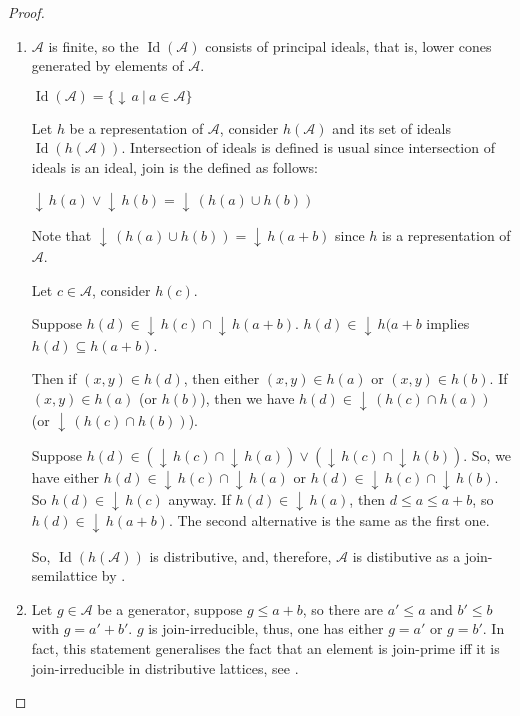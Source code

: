\documentclass[a4paper]{article}
\theoremstyle{definition}
\theoremstyle{theorem}
\theoremstyle{proposition}
\theoremstyle{lemma}
\theoremstyle{ex}
\theoremstyle{corollary}
\theoremstyle{claim}
\newcommand{\down}[1]{\ensuremath{{\downarrow}\,#1}}
\begin{document}
\begin{proof}
$ $

  \begin{enumerate}
    \item
    $\mathcal{A}$ is finite, so the $\operatorname{Id}(\mathcal{A})$ consists of principal ideals, that is, lower cones generated by elements of $\mathcal{A}$.

    \begin{center}
    $\operatorname{Id}(\mathcal{A}) = \{ \down{a} \: | \: a \in \mathcal{A} \}$
    \end{center}

    Let $h$ be a representation of $\mathcal{A}$, consider $h(\mathcal{A})$ and its set of ideals $\operatorname{Id}(h(\mathcal{A}))$. Intersection of ideals is defined is usual since intersection of ideals is an ideal, join is the defined as follows:

    \begin{center}
    $\down{h(a)} \vee \down{h(b)} = \down{(h(a) \cup h(b))}$
    \end{center}
    Note that $\down{(h(a) \cup h(b))} = \down{h(a + b)}$ since $h$ is a representation of $\mathcal{A}$.

    Let $c \in \mathcal{A}$, consider $h(c)$.

    Suppose $h(d) \in \down{h(c)} \cap \down{h(a + b)}$.
    $h(d) \in \down{h(a + b}$ implies $h(d) \subseteq h(a + b)$.

    Then if $(x, y) \in h(d)$, then either $(x, y) \in h(a)$ or $(x, y) \in h(b)$.
    If $(x, y) \in h(a)$ (or $h(b)$), then we have $h(d) \in \down{(h(c) \cap h(a))}$ (or $\down{(h(c) \cap h(b))}$).

    Suppose $h(d) \in (\down{h(c)} \cap \down{h(a)}) \vee (\down{h(c)} \cap \down{h(b)})$. So, we have either $h(d) \in \down{h(c)} \cap \down{h(a)}$ or $h(d) \in \down{h(c)} \cap \down{h(b)}$. So $h(d) \in \down{h(c)}$ anyway. If $h(d) \in \down{h(a)}$, then $d \leq a \leq a + b$, so $h(d) \in \down{h(a + b)}$.
    The second alternative is the same as the first one.

    So, $\operatorname{Id}(h(\mathcal{A}))$ is distributive, and, therefore, $\mathcal{A}$ is distibutive as a join-semilattice by \cite[Lemma 184]{gratzer2011lattice}.

    \item Let $g \in \mathcal{A}$ be a generator, suppose $g \leq a + b$, so there are $a' \leq a$ and $b' \leq b$ with $g = a' + b'$. $g$ is join-irreducible, thus, one has either $g = a'$ or $g = b'$. In fact, this statement generalises the fact that an element is join-prime iff it is join-irreducible in distributive lattices, see \cite[Lemma 5.11]{davey2002introduction}.
  \end{enumerate}
\end{proof}
\end{document}
